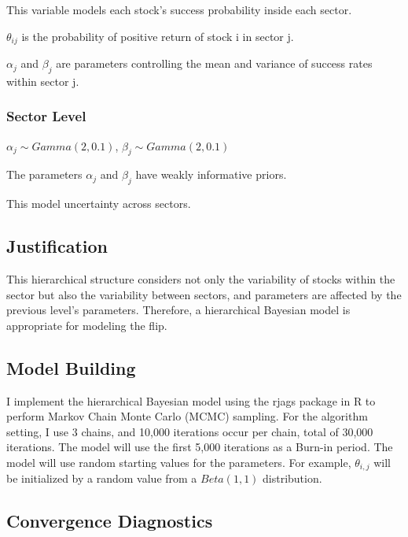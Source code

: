 \documentclass[
  11pt,
]{article}
\begin{document}
This variable models each stock's success probability inside each
sector.

\(\theta_{ij}\) is the probability of positive return of stock i in
sector j.

\(\alpha_j\) and \(\beta_j\) are parameters controlling the mean and
variance of success rates within sector j.

\subsubsection{Sector Level}\label{sector-level}

\(\alpha_j \sim Gamma(2, 0.1)\), \(\beta_j \sim Gamma(2, 0.1)\)

The parameters \(\alpha_j\) and \(\beta_j\) have weakly informative
priors.

This model uncertainty across sectors.

\subsection{Justification}\label{justification}

This hierarchical structure considers not only the variability of stocks
within the sector but also the variability between sectors, and
parameters are affected by the previous level's parameters. Therefore, a
hierarchical Bayesian model is appropriate for modeling the flip.

\subsection{Model Building}\label{model-building}

I implement the hierarchical Bayesian model using the rjags package in R
to perform Markov Chain Monte Carlo (MCMC) sampling. For the algorithm
setting, I use 3 chains, and 10,000 iterations occur per chain, total of
30,000 iterations. The model will use the first 5,000 iterations as a
Burn-in period. The model will use random starting values for the
parameters. For example, \(\theta_{i,j}\) will be initialized by a
random value from a \(Beta(1, 1)\) distribution.

\subsection{Convergence Diagnostics}\label{convergence-diagnostics}
\end{document}
